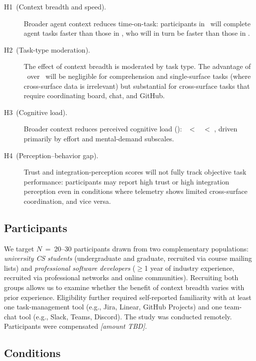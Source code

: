\begin{description}
  \item[H1~(Context breadth and speed).]
    Broader agent context reduces time-on-task: participants in \CIII\ will
    complete agent tasks faster than those in \CII, who will in turn be faster
    than those in \CI.

  \item[H2~(Task-type moderation).]
    The effect of context breadth is moderated by task type. The advantage of
    \CIII\ over \CI\ will be negligible for comprehension and single-surface
    tasks (where cross-surface data is irrelevant) but substantial for
    cross-surface tasks that require coordinating board, chat, and GitHub.

  \item[H3~(Cognitive load).]
    Broader context reduces perceived cognitive load (\NASATLX): \CIII\ $<$
    \CII\ $<$ \CI, driven primarily by effort and mental-demand subscales.

  \item[H4~(Perception--behavior gap).]
    Trust and integration-perception scores will not fully track objective task
    performance: participants may report high trust or high integration
    perception even in conditions where telemetry shows limited cross-surface
    coordination, and vice versa.
\end{description}

\subsection{Participants}
\label{sec:study:participants}


We target $N$~=~20--30 participants drawn from two complementary populations:
\emph{university CS students} (undergraduate and graduate, recruited via
course mailing lists) and \emph{professional software developers} ($\geq$1 year
of industry experience, recruited via professional networks and online
communities). Recruiting both groups allows us to examine whether the benefit of
context breadth varies with prior experience. Eligibility further required
self-reported familiarity with at least one task-management tool (e.g., Jira,
Linear, GitHub Projects) and one team-chat tool (e.g., Slack, Teams, Discord).
The study was conducted remotely. Participants were compensated
\emph{[amount TBD]}.

\subsection{Conditions}
\label{sec:study:conditions}

